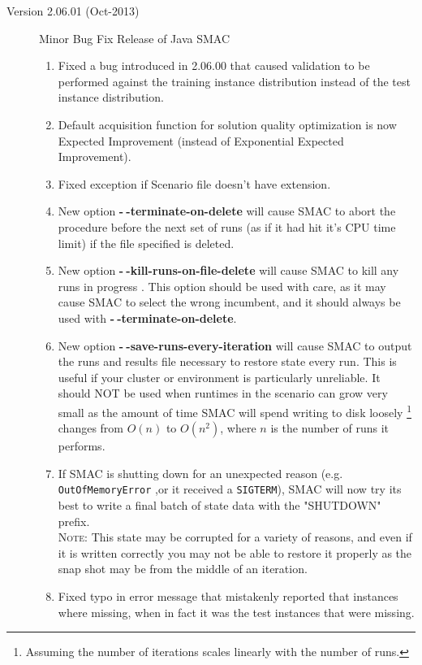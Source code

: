 \documentclass[11pt,letterpaper,oneside]{article}
\begin{document}
\begin{description}
			\item[Version 2.06.01 (Oct-2013)] Minor Bug Fix Release of Java SMAC
	              \begin{enumerate}
	              	 \item Fixed a bug introduced in 2.06.00 that caused validation to be performed against the training instance distribution instead of the test instance distribution.
                     \item Default acquisition function for solution quality optimization is now Expected Improvement (instead of Exponential Expected Improvement).
                     \item Fixed exception if Scenario file doesn't have extension.
                     \item New option \textbf{-$~\!$-terminate-on-delete} will cause SMAC to abort the procedure before the next set of runs (as if it had hit it's CPU time limit) if the file specified is deleted.
                     \item New option \textbf{-$~\!$-kill-runs-on-file-delete} will cause SMAC to kill any runs in progress . This option should be used with care, as it may cause SMAC to select the wrong incumbent, and it should always be used with \textbf{-$~\!$-terminate-on-delete}.
                     \item New option \textbf{-$~\!$-save-runs-every-iteration} will cause SMAC to output the runs and results file necessary to restore state every run. This is useful if your cluster or environment is particularly unreliable. It should \textsc{NOT} be used when runtimes in the scenario can grow very small as the amount of time SMAC will spend writing to disk loosely \footnote{Assuming the number of iterations scales linearly with the number of runs.} changes from $O(n)$ to $O(n^2)$, where $n$ is the number of runs it performs.
                     \item If SMAC is shutting down for an unexpected reason (e.g. \texttt{OutOfMemoryError} ,or it received a \texttt{SIGTERM}), SMAC will now try its best to write a final batch of state data with the "SHUTDOWN" prefix. \\
                      \textsc{Note:} This state may be corrupted for a variety of reasons, and even if it is written correctly you may not be able to restore it properly as the snap shot may be from the middle of an iteration.
                     \item Fixed typo in error message that mistakenly reported that instances where missing, when in fact it was the test instances that were missing.                     
                  \end{enumerate}
                  

\end{description}
\end{document}
